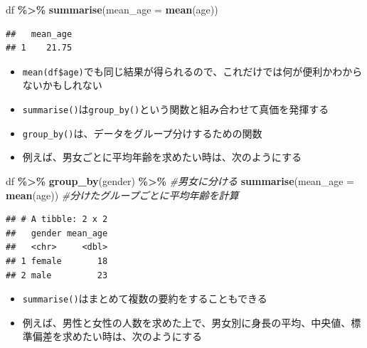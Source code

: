 \documentclass[
]{book}
\newenvironment{Shaded}{\begin{snugshade}}{\end{snugshade}}
\newcommand{\AttributeTok}[1]{\textcolor[rgb]{0.13,0.29,0.53}{#1}}
\newcommand{\CommentTok}[1]{\textcolor[rgb]{0.56,0.35,0.01}{\textit{#1}}}
\newcommand{\FunctionTok}[1]{\textcolor[rgb]{0.13,0.29,0.53}{\textbf{#1}}}
\newcommand{\NormalTok}[1]{#1}
\newcommand{\SpecialCharTok}[1]{\textcolor[rgb]{0.81,0.36,0.00}{\textbf{#1}}}
\providecommand{\tightlist}{%
  \setlength{\itemsep}{0pt}\setlength{\parskip}{0pt}}
\begin{document}
\begin{Shaded}
\begin{Highlighting}[]
\NormalTok{df }\SpecialCharTok{\%\textgreater{}\%}
  \FunctionTok{summarise}\NormalTok{(}\AttributeTok{mean\_age =} \FunctionTok{mean}\NormalTok{(age))}
\end{Highlighting}
\end{Shaded}

\begin{verbatim}
##   mean_age
## 1    21.75
\end{verbatim}

\begin{itemize}
\tightlist
\item
  \texttt{mean(df\$age)}でも同じ結果が得られるので、これだけでは何が便利かわからないかもしれない
\item
  \texttt{summarise()}は\texttt{group\_by()}という関数と組み合わせて真価を発揮する
\item
  \texttt{group\_by()}は、データをグループ分けするための関数
\item
  例えば、男女ごとに平均年齢を求めたい時は、次のようにする
\end{itemize}

\begin{Shaded}
\begin{Highlighting}[]
\NormalTok{df }\SpecialCharTok{\%\textgreater{}\%}
  \FunctionTok{group\_by}\NormalTok{(gender) }\SpecialCharTok{\%\textgreater{}\%} \CommentTok{\#男女に分ける}
  \FunctionTok{summarise}\NormalTok{(}\AttributeTok{mean\_age =} \FunctionTok{mean}\NormalTok{(age)) }\CommentTok{\#分けたグループごとに平均年齢を計算}
\end{Highlighting}
\end{Shaded}

\begin{verbatim}
## # A tibble: 2 x 2
##   gender mean_age
##   <chr>     <dbl>
## 1 female       18
## 2 male         23
\end{verbatim}

\begin{itemize}
\tightlist
\item
  \texttt{summarise()}はまとめて複数の要約をすることもできる
\item
  例えば、男性と女性の人数を求めた上で、男女別に身長の平均、中央値、標準偏差を求めたい時は、次のようにする
\end{itemize}
\end{document}
